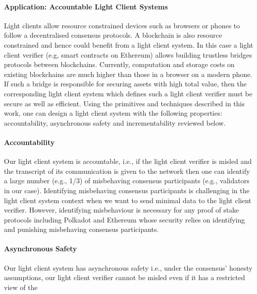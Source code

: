 \paragraph{Application: Accountable Light Client Systems} %
Light clients allow resource constrained devices such as browsers or phones to follow a decentralised consensus protocols. A blockchain is also resource constrained and hence could benefit from a light client system. In this case a light client verifier (e.g, smart contracts on 
Ethereum) allows building trustless bridges protocols between blockchains. %
Currently, computation and storage 
costs on existing blockchains are much higher than those in a browser on a modern phone. If such a bridge is responsible for securing assets with high total value, then the corresponding light client system which defines such a light client verifier must be secure as well as efficient. Using the primitives and techniques described in this work, one can design a light client system with the following properties: accountability, asynchronous safety and incrementability reviewed below.  \vspace{-0.2cm}
\noindent\paragraph{Accountability}Our light client system is accountable, i.e., if the light client verifier is misled and the transcript of its communication is given to the network then one can identify a large 
number (e.g., 1/3) of misbehaving consensus participants (e.g., validators in our case). Identifying misbehaving consensus participants 
is challenging in the light client system context when we want to send minimal data to the light client verifier. However, 
identifying misbehaviour is necessary for any proof of stake protocols including Polkadot and Ethereum whose security relies on identifying and punishing misbehaving consensus participants. 
\vspace{-0.2cm}
\noindent\paragraph{Asynchronous Safety}Our light client system has asynchronous safety i.e., under the consensus' honesty assumptions, our light client verifier cannot be misled even if it has a restricted view of the 
